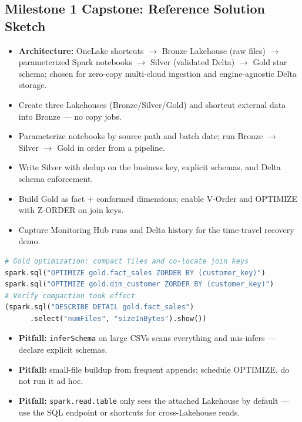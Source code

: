 \documentclass[11pt, a4paper]{article}
\begin{document}
\subsection*{Milestone 1 Capstone: Reference Solution Sketch}
\begin{itemize}[label=-, itemsep=0pt]
    \item \textbf{Architecture:} OneLake shortcuts $\rightarrow$ Bronze Lakehouse (raw files) $\rightarrow$ parameterized Spark notebooks $\rightarrow$ Silver (validated Delta) $\rightarrow$ Gold star schema; chosen for zero-copy multi-cloud ingestion and engine-agnostic Delta storage.
    \item Create three Lakehouses (Bronze/Silver/Gold) and shortcut external data into Bronze --- no copy jobs.
    \item Parameterize notebooks by source path and batch date; run Bronze $\rightarrow$ Silver $\rightarrow$ Gold in order from a pipeline.
    \item Write Silver with dedup on the business key, explicit schemas, and Delta schema enforcement.
    \item Build Gold as fact + conformed dimensions; enable V-Order and OPTIMIZE with Z-ORDER on join keys.
    \item Capture Monitoring Hub runs and Delta history for the time-travel recovery demo.
\end{itemize}
\begin{lstlisting}[language=Python]
# Gold optimization: compact files and co-locate join keys
spark.sql("OPTIMIZE gold.fact_sales ZORDER BY (customer_key)")
spark.sql("OPTIMIZE gold.dim_customer ZORDER BY (customer_key)")
# Verify compaction took effect
(spark.sql("DESCRIBE DETAIL gold.fact_sales")
      .select("numFiles", "sizeInBytes").show())
\end{lstlisting}
\begin{itemize}[label=-, itemsep=0pt]
    \item \textbf{Pitfall:} \texttt{inferSchema} on large CSVs scans everything and mis-infers --- declare explicit schemas.
    \item \textbf{Pitfall:} small-file buildup from frequent appends; schedule OPTIMIZE, do not run it ad hoc.
    \item \textbf{Pitfall:} \texttt{spark.read.table} only sees the attached Lakehouse by default --- use the SQL endpoint or shortcuts for cross-Lakehouse reads.
\end{itemize}
\end{document}
